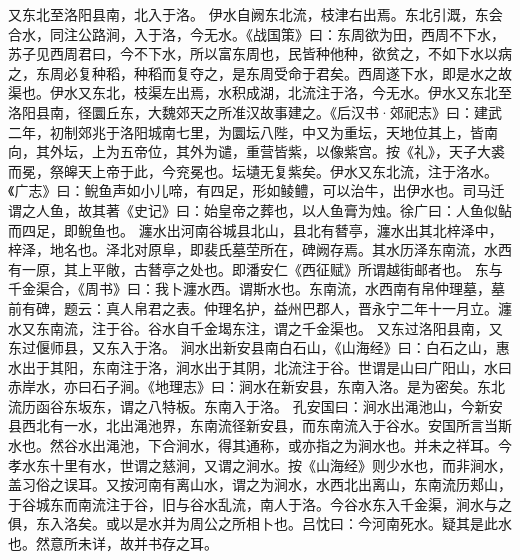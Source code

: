 \documentclass[12pt,UTF8]{ctexbook}
\begin{document}
又东北至洛阳县南，北入于洛。
伊水自阙东北流，枝津右出焉。东北引溉，东会合水，同注公路涧，入于洛，今无水。《战国策》曰：东周欲为田，西周不下水，苏子见西周君曰，今不下水，所以富东周也，民皆种他种，欲贫之，不如下水以病之，东周必复种稻，种稻而复夺之，是东周受命于君矣。西周遂下水，即是水之故渠也。伊水又东北，枝渠左出焉，水积成湖，北流注于洛，今无水。伊水又东北至洛阳县南，径圜丘东，大魏郊天之所准汉故事建之。《后汉书·郊祀志》曰：建武二年，初制郊兆于洛阳城南七里，为圜坛八陛，中又为重坛，天地位其上，皆南向，其外坛，上为五帝位，其外为谴，重营皆紫，以像紫宫。按《礼》，天子大裘而冕，祭皞天上帝于此，今兖冕也。坛壝无复紫矣。伊水又东北流，注于洛水。《广志》曰：鲵鱼声如小儿啼，有四足，形如鲮鳢，可以治牛，出伊水也。司马迁谓之人鱼，故其著《史记》曰：始皇帝之葬也，以人鱼膏为烛。徐广曰：人鱼似鲇而四足，即鲵鱼也。
瀍水出河南谷城县北山，县北有朁亭，瀍水出其北梓泽中，梓泽，地名也。泽北对原阜，即裴氏墓茔所在，碑阙存焉。其水历泽东南流，水西有一原，其上平敞，古朁亭之处也。即潘安仁《西征赋》所谓越街邮者也。
东与千金渠合，《周书》曰：我卜瀍水西。谓斯水也。东南流，水西南有帛仲理墓，墓前有碑，题云：真人帛君之表。仲理名护，益州巴郡人，晋永宁二年十一月立。瀍水又东南流，注于谷。谷水自千金堨东注，谓之千金渠也。
又东过洛阳县南，又东过偃师县，又东入于洛。
涧水出新安县南白石山，《山海经》曰：白石之山，惠水出于其阳，东南注于洛，涧水出于其阴，北流注于谷。世谓是山曰广阳山，水曰赤岸水，亦曰石子涧。《地理志》曰：涧水在新安县，东南入洛。是为密矣。东北流历函谷东坂东，谓之八特板。东南入于洛。
孔安国曰：涧水出渑池山，今新安县西北有一水，北出渑池界，东南流径新安县，而东南流入于谷水。安国所言当斯水也。然谷水出渑池，下合涧水，得其通称，或亦指之为涧水也。并未之祥耳。今孝水东十里有水，世谓之慈涧，又谓之涧水。按《山海经》则少水也，而非涧水，盖习俗之误耳。又按河南有离山水，谓之为涧水，水西北出离山，东南流历郏山，于谷城东而南流注于谷，旧与谷水乱流，南人于洛。今谷水东入千金渠，涧水与之俱，东入洛矣。或以是水并为周公之所相卜也。吕忱曰：今河南死水。疑其是此水也。然意所未详，故并书存之耳。
\end{document}
